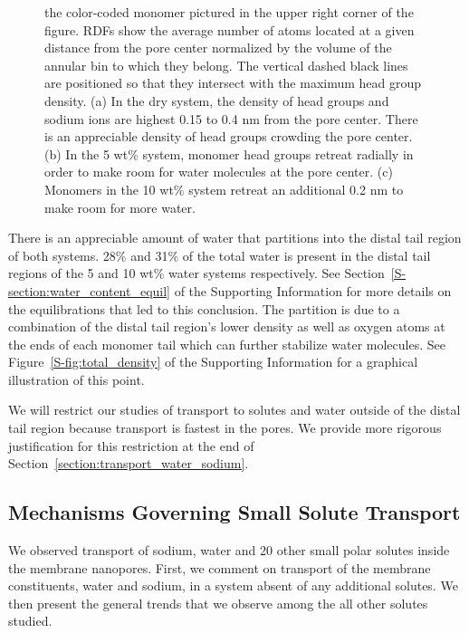 \documentclass[journal=jpcbfk,manuscript=article]{achemso}
\begin{document}
\begin{figure}[!htb]
{  the color-coded monomer pictured in the upper right corner of the figure. 
  RDFs show the average number of atoms located at a given distance from the
  pore center normalized by the volume of the annular bin to which they belong.
  The vertical dashed black lines are positioned so that they intersect with 
  the maximum head group density.
  (a) In the dry system, the density of head groups and sodium ions are highest
  0.15 to 0.4 nm from the pore center. There is an appreciable density of head groups
  crowding the pore center. (b) In the 5 wt\% system, monomer head 
  groups retreat radially in order to make room for water molecules at the pore center.
  (c) Monomers in the 10 wt\% system retreat an additional 0.2 nm to make room
  for more water.}\label{fig:component_densities}
  \end{figure}
  

  There is an appreciable amount of water that partitions into the distal tail
  region of both systems. 28\% and 31\% of the total water is present in the
  distal tail regions of the 5 and 10 wt\% water systems respectively. See 
  Section~\ref{S-section:water_content_equil} of the Supporting Information 
  for more details on the equilibrations that led to this conclusion. The partition
  is due to a combination of the distal tail region's lower density as well
  as oxygen atoms at the ends of each monomer tail which can further stabilize
  water molecules. See Figure~\ref{S-fig:total_density} of the Supporting 
  Information for a graphical illustration of this point.
  
  We will restrict our studies of transport to solutes and water outside of the 
  distal tail region because transport is fastest in the pores. We provide more 
  rigorous justification for this restriction at the end of Section~\ref{section:transport_water_sodium}.

  \subsection{Mechanisms Governing Small Solute Transport}\label{section:mechanism_overview} 

  We observed transport of sodium, water and 20 other small polar solutes
  inside the membrane nanopores. First, we comment on transport of the
  membrane constituents, water and sodium, in a system absent of any additional
  solutes. We then present the general trends that we observe among the
  all other solutes studied.
  
\end{document}
